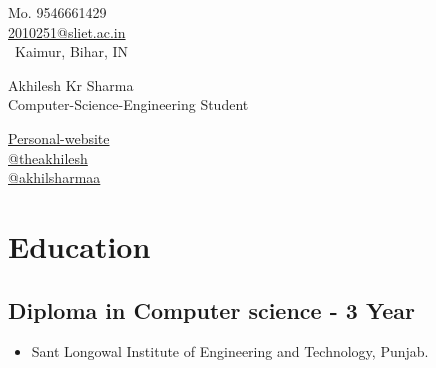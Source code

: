 \documentclass[a4,11pt]{article}
\newenvironment{zitemize}{
\begin{itemize}\itemsep0pt \parskip0pt \parsep1pt}
{\end{itemize}\vspace{-0.5cm}}
\begin{document}
\begin{center}
    \begin{minipage}[b]{0.25\textwidth}
            \flushleft \large  %
            \large \color{UI_blue} Mo. 9546661429 \\
            \large \href{mailto:2010251@sliet.ac.in}{2010251@sliet.ac.in}  \\
            \large \faMapMarker\ Kaimur, Bihar, IN \\
    \end{minipage}%
    \begin{minipage}[b]{0.5\textwidth}
            \centering
            {\HUGE Akhilesh Kr Sharma} \\ 
            \vspace{0.1cm}
            {\large Computer-Science-Engineering Student } \\
    \end{minipage}%
    \begin{minipage}[b]{0.25\textwidth}
            \flushright \large  %
            {\href{https://akhilsharmaa.github.io/profile}
            {\color{UI_blue} Personal-website} \color{black}{\faGlobe}} \\
            {\href{https://www.linkedin.com/in/theakhilesh/}
            {\color{UI_blue} @theakhilesh} \faLinkedin } \\
            {\href{https://www.github.com/akhilsharmaa/}
            { \color{UI_blue}@akhilsharmaa} \faGithub } \\
    \end{minipage}   
\end{center}

\vspace{-0.7cm}
\section{Education}

\subsection{\large Diploma in Computer science - 3 Year   
\hfill {} }
\begin{zitemize}
    \setlength\itemsep{-0.1em}
        \item Sant Longowal Institute of Engineering and Technology, Punjab.
        \hfill {}
    \end{zitemize}
\vspace{-0.3cm}
\end{document}
